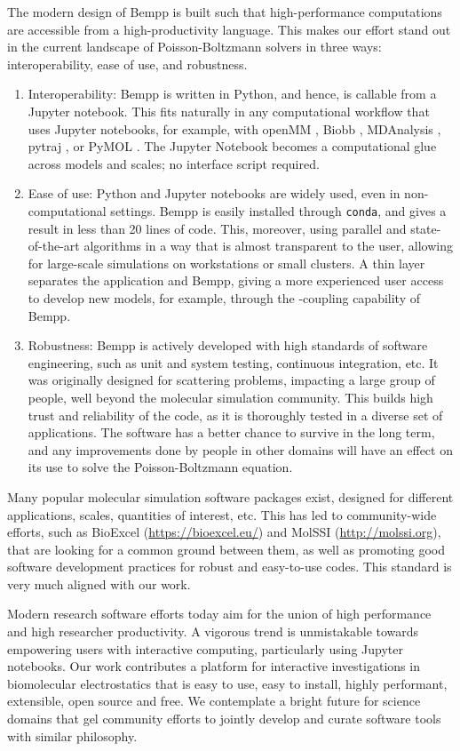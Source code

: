 The modern design of Bempp is built such that high-performance computations are accessible from a high-productivity language.
This makes our effort stand out in the current landscape of Poisson-Boltzmann solvers in three ways: interoperability, ease of use, and robustness. 
\begin{enumerate}
\item Interoperability: Bempp is written in Python, and hence, is callable from a Jupyter notebook. This fits naturally in any computational workflow that uses Jupyter notebooks, for example, with openMM \cite{EastmanETal2017}, Biobb \cite{AndrioETal2019}, MDAnalysis \cite{GowersETal2019}, pytraj \cite{RoeCheatham2013}, or PyMOL \cite{PyMOL}. The Jupyter Notebook becomes a computational glue across models and scales; no interface script required. 

\item Ease of use: Python and Jupyter notebooks are widely used, even in non-computational settings. Bempp is easily installed through \texttt{conda}, and gives a result in less than 20 lines of code. This, moreover, using parallel and state-of-the-art algorithms in a way that is almost transparent to the user, allowing for large-scale simulations on workstations or small clusters.
A thin layer separates the application and Bempp, giving a more experienced user access to develop new models, for example, through the \fmm-\bem coupling capability of Bempp.

\item Robustness: Bempp is actively developed with high standards of software engineering, such as unit and system testing, continuous integration, etc. It was originally designed for scattering problems, impacting a large group of people, well beyond the molecular simulation community. This builds high trust and reliability of the code, as it is thoroughly tested in a diverse set of applications. The software has a better chance to survive in the long term, and any improvements done by people in other domains will have an effect on its use to solve the Poisson-Boltzmann equation. 

\end{enumerate}

Many popular molecular simulation software packages exist, designed for different applications, scales, quantities of interest, etc.
This has led to community-wide efforts, such as BioExcel (\url{https://bioexcel.eu/}) and MolSSI (\url{http://molssi.org}), that are looking for a common ground between them, as well as promoting good software development practices for robust and easy-to-use codes.
This standard is very much aligned with our work.

Modern research software efforts today aim for the union of high performance and high researcher productivity.
A vigorous trend is unmistakable towards empowering users with interactive computing, particularly using Jupyter notebooks. 
Our work contributes a platform for interactive investigations in biomolecular electrostatics that is easy to use, easy to install, highly performant, extensible, open source and free.
We contemplate a bright future for science domains that gel community efforts to jointly develop and curate software tools with similar philosophy.
